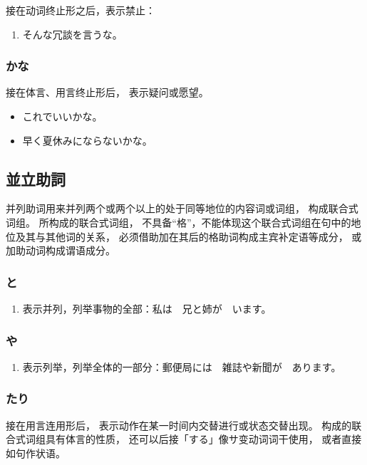 接在动词终止形之后，表示禁止：
\begin{enumerate}
  \item そんな冗談を言うな。
\end{enumerate}


\subsubsection{かな}%

接在体言、用言终止形后，
表示疑问或愿望。
\begin{itemize}
  \item これでいいかな。
  \item 早く夏休みにならないかな。
\end{itemize}


\subsection{並立助詞}%

并列助词用来并列两个或两个以上的处于同等地位的内容词或词组，
构成联合式词组。
所构成的联合式词组，
不具备``格''，不能体现这个联合式词组在句中的地位及其与其他词的关系，
必须借助加在其后的格助词构成主宾补定语等成分，
或加助动词构成谓语成分。


\subsubsection{と}%

\begin{enumerate}
  \item 表示并列，列举事物的全部：私は　兄と姉が　います。
\end{enumerate}


\subsubsection{や}%

\begin{enumerate}
  \item 表示列举，列举全体的一部分：郵便局には　雑誌や新聞が　あります。
\end{enumerate}


\subsubsection{たり}%

接在用言连用形后，
表示动作在某一时间内交替进行或状态交替出现。
构成的联合式词组具有体言的性质，
还可以后接「する」像サ变动词词干使用，
或者直接如句作状语。

